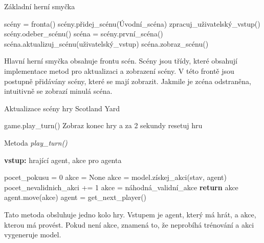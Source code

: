 \begin{algorithm}[H]
  \begin{algorithmic}
    \caption{Základní herní smyčka}
    \label{alg:GameController}
      \State scény = fronta()
      \State scény.přidej\_scénu(Úvodní\_scéna)
      \State
        \State zpracuj\_uživatelský\_vstup()
          \State scény.odeber\_scénu()
        \EndIf
        \State scéna = scény.první\_scéna()
        \State scéna.aktualizuj\_scénu(uživatelský\_vstup)
        \State scéna.zobraz\_scénu()
      \EndWhile
  \end{algorithmic}
\end{algorithm}

Hlavní herní smyčka obsahuje frontu scén.
Scény jsou třídy, které obsahují implementace metod pro aktualizaci a zobrazení scény.
V této frontě jsou postupně přidávány scény, které se mají zobrazit.
Jakmile je zcéna odstraněna, intuitivně se zobrazí minulá scéna.

\begin{algorithm}[H]
  \caption{Aktualizace scény hry Scotland Yard}
  \label{alg:GameScene}
  \begin{algorithmic}
      \State game.play\_turn()
        \State Zobraz konec hry a za 2 sekundy resetuj hru
      \EndIf
    \EndIf
  \end{algorithmic}
\end{algorithm}

\begin{algorithm}[H]
  \caption{Metoda \emph{play\_turn()}}
  \label{alg:play_turn}
  \begin{algorithmic}
    \State \textbf{vstup:} hrající agent, akce pro agenta
    \State

      \State pocet\_pokusu = 0
      \State akce = None
          \State akce = model.získej\_akci(stav, agent)
          \State pocet\_nevalidnich\_akci += 1
        \Else
        \State akce = náhodná\_validní\_akce
        \EndIf
      \EndWhile
      \State \textbf{return} akce
    \EndIf
    \State agent.move(akce)
    \State agent = get\_next\_player()
  \end{algorithmic}
\end{algorithm}

Tato metoda obsluhuje jedno kolo hry.
Vstupem je agent, který má hrát, a akce, kterou má provést.
Pokud není akce, znamená to, že neprobíhá trénování a akci vygeneruje model.


